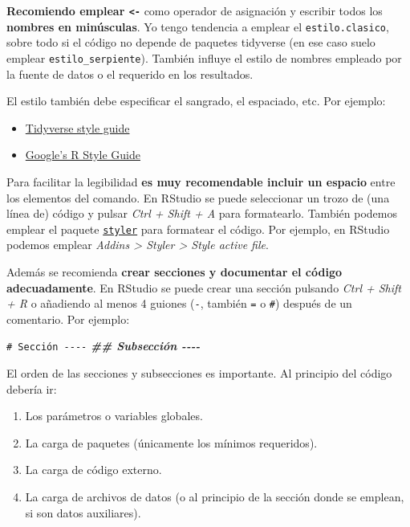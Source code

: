 \documentclass[
]{book}
\newenvironment{Shaded}{\begin{snugshade}}{\end{snugshade}}
\newcommand{\CommentTok}[1]{\textcolor[rgb]{0.56,0.35,0.01}{\textit{#1}}}
\newcommand{\DocumentationTok}[1]{\textcolor[rgb]{0.56,0.35,0.01}{\textbf{\textit{#1}}}}
\providecommand{\tightlist}{%
  \setlength{\itemsep}{0pt}\setlength{\parskip}{0pt}}
\theoremstyle{break}
\theoremstyle{nonumberplain}
\renewcommand{\CommentTok}[1]{\textcolor[rgb]{0.41,0.41,0.41}{\texttt{#1}}}
\begin{document}
\textbf{Recomiendo emplear \texttt{\textless{}-}} como operador de asignación y escribir todos los \textbf{nombres en minúsculas}.
Yo tengo tendencia a emplear el \texttt{estilo.clasico}, sobre todo si el código no depende de paquetes tidyverse (en ese caso suelo emplear \texttt{estilo\_serpiente}).
También influye el estilo de nombres empleado por la fuente de datos o el requerido en los resultados.

El estilo también debe especificar el sangrado, el espaciado, etc.
Por ejemplo:

\begin{itemize}
\item
  \href{https://style.tidyverse.org}{Tidyverse style guide}
\item
  \href{https://google.github.io/styleguide/Rguide.html}{Google's R Style Guide}
\end{itemize}

Para facilitar la legibilidad \textbf{es muy recomendable incluir un espacio} entre los elementos del comando.
En RStudio se puede seleccionar un trozo de (una línea de) código y pulsar \emph{Ctrl + Shift + A} para formatearlo.
También podemos emplear el paquete \href{https://github.com/r-lib/styler}{\texttt{styler}} para formatear el código.
Por ejemplo, en RStudio podemos emplear \emph{Addins \textgreater{} Styler \textgreater{} Style active file}.

Además se recomienda \textbf{crear secciones y documentar el código adecuadamente}.
En RStudio se puede crear una sección pulsando \emph{Ctrl + Shift + R} o añadiendo al menos 4 guiones (\texttt{-}, también \texttt{=} o \texttt{\#}) después de un comentario.
Por ejemplo:

\begin{Shaded}
\begin{Highlighting}[]
\CommentTok{\# Sección {-}{-}{-}{-}}
\DocumentationTok{\#\# Subsección {-}{-}{-}{-}}
\end{Highlighting}
\end{Shaded}

El orden de las secciones y subsecciones es importante.
Al principio del código debería ir:

\begin{enumerate}
\def\labelenumi{\arabic{enumi}.}
\tightlist
\item
  Los parámetros o variables globales.
\item
  La carga de paquetes (únicamente los mínimos requeridos).
\item
  La carga de código externo.
\item
  La carga de archivos de datos (o al principio de la sección donde se emplean, si son datos auxiliares).
\end{enumerate}
\end{document}
